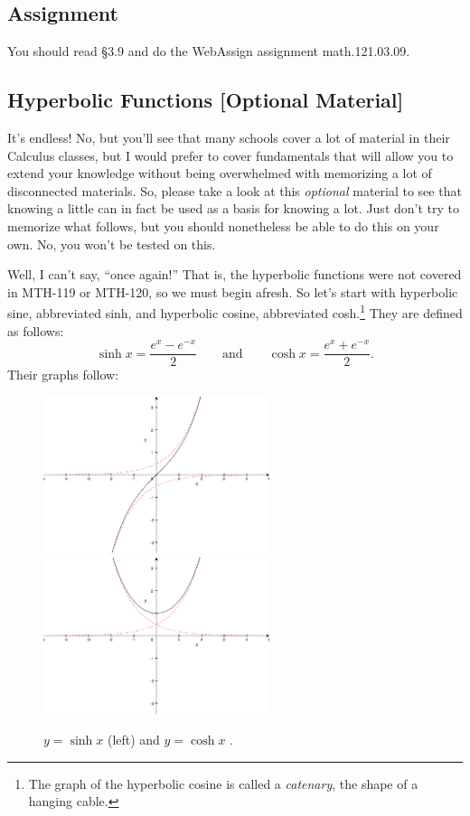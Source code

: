 \documentclass[12pt,addpoints, answers, fleqn]{exam}
\begin{document}
\subsection{Assignment}
You should read \S  3.9 and do the WebAssign assignment math.121.03.09.

\vfill
\pagebreak





\subsection{Hyperbolic Functions [Optional Material]}

It's endless! No, but you'll see that many schools cover a lot of material in their Calculus classes, but I would prefer to cover fundamentals that will allow you to extend your knowledge without being overwhelmed with memorizing a lot of disconnected materials. So, please take a look at this \emph{optional} material to see that knowing a little can in fact be used as a basis for knowing a lot. Just don't try to memorize what follows, but you should nonetheless be able to do this on your own. No, you won't be tested on this.


Well, I can't say, ``once again!'' That is, the hyperbolic functions were not covered in MTH-119 or MTH-120, so we must begin afresh. So let's start with hyperbolic sine, abbreviated sinh, and hyperbolic cosine, abbreviated cosh.\footnote{The graph of the hyperbolic cosine is called a \emph{catenary}, the shape of a hanging cable.} They are defined as follows:
\[
\sinh x = \frac{e^x-e^{-x}}{2} \qquad \mbox{and} \qquad
\cosh x = \frac{e^x+e^{-x}}{2}.
\]
Their graphs follow:
\begin{figure}[htbp] %
   \centering
   \includegraphics[width=2.6in]{./graphics/graph1703.pdf} \includegraphics[width=2.6in]{./graphics/graph1704.pdf} 
   \caption{$y=\sinh x$ (left) and $y=\cosh x$ .}
   \label{fig:graph170304}
\end{figure}
\end{document}
